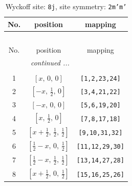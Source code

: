 \documentclass[fleqn,8pt]{jsarticle}
\begin{document}
\begin{longtable}{ccc}
\caption{Wyckoff site: {\tt 8j}, site symmetry: {\tt 2m'm'}}
 \\
 \hline \hline
No. & position & mapping \\ \hline \endfirsthead

\multicolumn{2}{l}{\tablename\ \thetable{}} \\
 \hline \hline
No. & position & mapping \\ \hline \endhead

 \hline \hline
\multicolumn{2}{r}{\footnotesize\it continued ...} \\ \endfoot

 \hline \hline
\multicolumn{2}{r}{} \\ \endlastfoot

1 & $\left[ x,\, 0,\, 0 \right]$ & {\tt [1,2,23,24]} \\ \hline
2 & $\left[ - x,\, \frac{1}{2},\, 0 \right]$ & {\tt [3,4,21,22]} \\ \hline
3 & $\left[ - x,\, 0,\, 0 \right]$ & {\tt [5,6,19,20]} \\ \hline
4 & $\left[ x,\, \frac{1}{2},\, 0 \right]$ & {\tt [7,8,17,18]} \\ \hline
5 & $\left[ x + \frac{1}{2},\, \frac{1}{2},\, \frac{1}{2} \right]$ & {\tt [9,10,31,32]} \\ \hline
6 & $\left[ \frac{1}{2} - x,\, 0,\, \frac{1}{2} \right]$ & {\tt [11,12,29,30]} \\ \hline
7 & $\left[ \frac{1}{2} - x,\, \frac{1}{2},\, \frac{1}{2} \right]$ & {\tt [13,14,27,28]} \\ \hline
8 & $\left[ x + \frac{1}{2},\, 0,\, \frac{1}{2} \right]$ & {\tt [15,16,25,26]} \\
\end{longtable}
\renewcommand{\arraystretch}{1.2}
\end{document}
